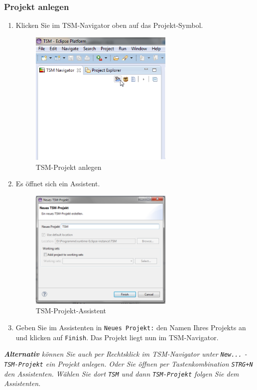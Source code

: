 \documentclass[11pt,a4paper,titlepage]{article}
\begin{document}
\subsubsection{Projekt anlegen}
\begin{enumerate}
\item Klicken Sie im TSM-Navigator oben auf das Projekt-Symbol.
\begin{figure}[H]
\centering
\includegraphics[width= 260px]{BilderHandbuchTSMNavigator/Projekt/Projekt.png}
\caption{TSM-Projekt anlegen}
\label{fig:Projekt}
\end{figure}
\item Es öffnet sich ein Assistent.

\begin{figure}[H]
\centering
\includegraphics[width= 260px]{BilderHandbuchTSMNavigator/Projekt/ProjektAssistent.png}
\caption{TSM-Projekt-Assistent}
\label{fig:Projekt}
\end{figure}

\item Geben Sie im Assistenten in \texttt{Neues Projekt:} den Namen Ihres Projekts an und klicken auf \texttt{Finish}. Das Projekt liegt nun im TSM-Navigator.
\end{enumerate}
\textit{\textbf{Alternativ} können Sie auch per Rechtsklick im TSM-Navigator unter \texttt{New...} - \texttt{TSM-Projekt} ein Projekt anlegen.
Oder Sie öffnen per Tastenkombination \texttt{STRG+N} den Assistenten. Wählen Sie dort \texttt{TSM} und dann \texttt{TSM-Projekt} folgen Sie dem Assistenten.}
\end{document}
